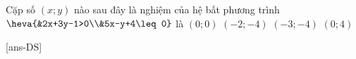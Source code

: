 \begin{ex}%
	Cặp số $(x;y)$ nào sau đây là nghiệm của hệ bất phương trình $\heva{&2x+3y-1>0\\&5x-y+4\leq 0}$ là
	\choice
	{$(0;0)$}
	{$(-2;-4)$}
	{$(-3;-4)$}
	{\True $(0;4)$}
\end{ex}


\cauds

[ans-DS]

